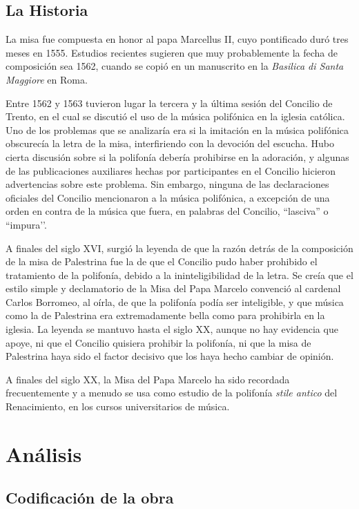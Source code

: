 \documentclass[letterpaper,12pt]{book}
\theoremstyle{definition} \newtheorem{Def}{Definición}[chapter]
\theoremstyle{definition} \newtheorem{Teo}{Teorema}[chapter]
\theoremstyle{definition} \newtheorem{Pro}{Proposición}[chapter]
\theoremstyle{definition} \newtheorem{Lema}{Lema}[chapter]
\begin{document}
\subsection{La Historia}

La misa fue compuesta en honor al papa Marcellus II, cuyo pontificado duró tres meses en 1555. Estudios recientes sugieren que muy probablemente la fecha de composición sea 1562, cuando se copió en un manuscrito en la \emph{Basilica di Santa Maggiore} en Roma.

Entre 1562 y 1563 tuvieron lugar la tercera y la última sesión del Concilio de Trento, en el cual se discutió el uso de la música polifónica en la iglesia católica. Uno de los problemas que se analizaría era si la imitación en la música polifónica obscurecía la letra de la misa, interfiriendo con la devoción del escucha. Hubo cierta discusión sobre si la polifonía debería prohibirse en la adoración, y algunas de las publicaciones auxiliares hechas por participantes en el Concilio hicieron advertencias sobre este problema. Sin embargo, ninguna de las declaraciones oficiales del Concilio mencionaron a la música polifónica, a excepción de una orden en contra de la música que fuera, en palabras del Concilio, ``lasciva'' o ``impura’’. 

A finales del siglo XVI, surgió la leyenda de que la razón detrás de la composición de la misa de Palestrina fue la de que el Concilio pudo haber prohibido el tratamiento de la polifonía, debido a la ininteligibilidad de la letra. Se creía que el estilo simple y declamatorio de la Misa del Papa Marcelo convenció al cardenal Carlos Borromeo, al oírla, de que la polifonía podía ser inteligible, y que música como la de Palestrina era extremadamente bella como para prohibirla en la iglesia. La leyenda se mantuvo hasta el siglo XX, aunque no hay evidencia que apoye, ni que el Concilio quisiera prohibir la polifonía, ni que la misa de Palestrina haya sido el factor decisivo que los haya hecho cambiar de opinión.

A finales del siglo XX, la Misa del Papa Marcelo ha sido recordada frecuentemente y a menudo se usa como estudio de la polifonía \emph{stile antico} del Renacimiento, en los cursos universitarios de música.

\section{Análisis}

\subsection{Codificación de la obra}
\end{document}
